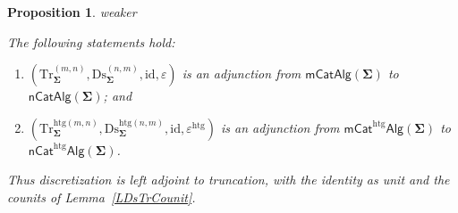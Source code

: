 \documentclass[a4paper, reqno]{amsbook}
\makeatletter
\newcommand{\sig}[1]{\mathbf{#1}}             %
\newcommand{\htg}{\mathrm{htg}}                %
\newcommand{\id}{\mathrm{id}}
\newcommand{\Ds}{\mathrm{Ds}}
\newcommand{\Tr}{\mathrm{Tr}}
\theoremstyle{plain}
\newtheorem{proposition}[theorem]{Proposition}
\theoremstyle{definition}
\newcommand*{\CA@leanpending}{}
\newcommand*{\CA@leanrelation}{}
\newcommand*{\lean}[2]{%
  \ifcsname\string\color@lean@#1\endcsname\else
    \PackageError{main}{Unknown relation `#1' in \string\lean}{Use equivalent, weaker or stronger.}%
  \fi
  \gdef\CA@leanrelation{#1}%
  \gdef\CA@leanpending{#2}}
\makeatother
\begin{document}
\begin{proposition}\label{PDsTrAdj}\lean{weaker}{Dimensions.homogeneousAdjunction,Dimensions.heterogeneousAdjunction}
The following statements hold:
\begin{enumerate}
\item $(\Tr^{(m,n)}_{\sig{\Sigma}},\Ds^{(n,m)}_{\sig{\Sigma}},\id,\varepsilon)$ is an adjunction from $\mathsf{mCatAlg}(\sig{\Sigma})$ to $\mathsf{nCatAlg}(\sig{\Sigma})$; and
\item $(\Tr^{\htg(m,n)}_{\sig{\Sigma}},\Ds^{\htg(n,m)}_{\sig{\Sigma}},\id,\varepsilon^{\htg})$ is an adjunction from $\mathsf{mCat}^{\htg}\mathsf{Alg}(\sig{\Sigma})$ to $\mathsf{nCat}^{\htg}\mathsf{Alg}(\sig{\Sigma})$.
\end{enumerate}
Thus discretization is left adjoint to truncation, with the identity as unit and the counits of Lemma~\ref{LDsTrCounit}.
\end{proposition}
\end{document}
